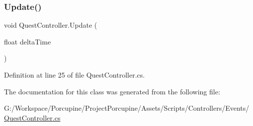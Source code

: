 \subsubsection{\texorpdfstring{Update()}{Update()}}
{\footnotesize\ttfamily void Quest\+Controller.\+Update (\begin{DoxyParamCaption}\item[{float}]{delta\+Time }\end{DoxyParamCaption})}



Definition at line 25 of file Quest\+Controller.\+cs.



The documentation for this class was generated from the following file\+:\begin{DoxyCompactItemize}
\item 
G\+:/\+Workspace/\+Porcupine/\+Project\+Porcupine/\+Assets/\+Scripts/\+Controllers/\+Events/\hyperlink{_quest_controller_8cs}{Quest\+Controller.\+cs}\end{DoxyCompactItemize}
